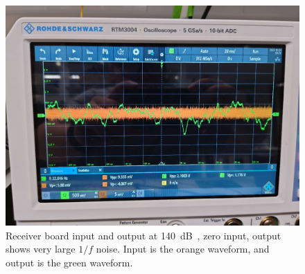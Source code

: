 \begin{figure}[h]
\centerline{\includegraphics[width=1\linewidth]{4-ANC_Sys/LargeNoiseRecBoard.jpg}}
\caption{Receiver board input and output at \qty{140}{dB\Omega}, zero input, output shows very large $1/f$ noise.  Input is the orange waveform, and output is the green waveform.}
\label{fig_ReceiverBoardLargeNoise}
\end{figure}

